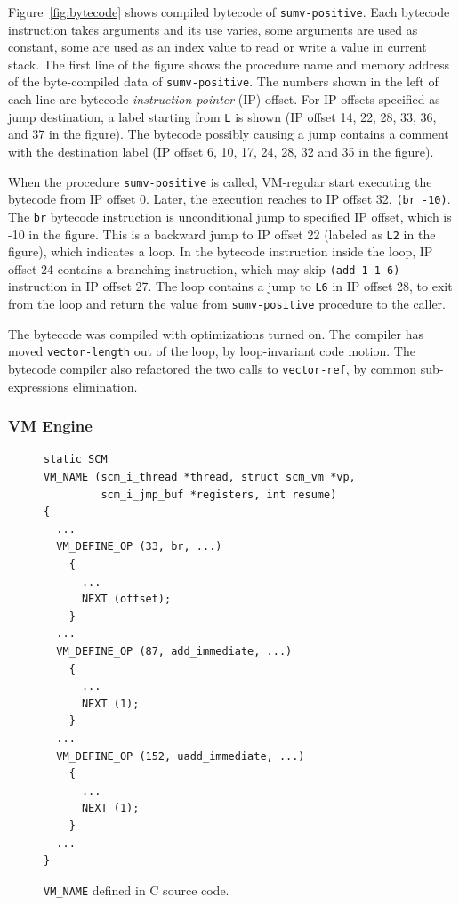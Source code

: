 \documentclass[preprint, 10pt]{sigplanconf}
\begin{document}
Figure~\hyperref[fig:bytecode]{\ref{fig:bytecode}} shows compiled bytecode of
\texttt{sumv-positive}. Each bytecode instruction takes arguments and its use
varies, some arguments are used as constant, some are used as an index value to
read or write a value in current stack. The first line of the figure shows the
procedure name and memory address of the byte-compiled data of
\texttt{sumv-positive}. The numbers shown in the left of each line are bytecode
\textit{instruction pointer} (IP) offset. For IP offsets specified as jump
destination, a label starting from \texttt{L} is shown (IP offset 14, 22, 28,
33, 36, and 37 in the figure). The bytecode possibly causing a jump contains a
comment with the destination label (IP offset 6, 10, 17, 24, 28, 32 and 35 in
the figure).

When the procedure \texttt{sumv-positive} is called, VM-regular start executing the
bytecode from IP offset 0. Later, the execution reaches to IP offset 32,
\texttt{(br -10)}. The \texttt{br} bytecode instruction is unconditional jump to
specified IP offset, which is -10 in the figure. This is a backward jump to IP
offset 22 (labeled as \texttt{L2} in the figure), which indicates a loop. In the
bytecode instruction inside the loop, IP offset 24 contains a branching
instruction, which may skip \texttt{(add 1 1 6)} instruction in IP offset
27. The loop contains a jump to \texttt{L6} in IP offset 28, to exit from the
loop and return the value from \texttt{sumv-positive} procedure to the caller.

The bytecode was compiled with optimizations turned on. The compiler has moved
\texttt{vector-length} out of the loop, by loop-invariant code motion. The
bytecode compiler also refactored the two calls to \texttt{vector-ref}, by
common sub-expressions elimination.

\subsubsection{VM Engine}
\label{sec:guilevmengine}

\begin{figure}
  \centering
  \small
\begin{verbatim}
static SCM
VM_NAME (scm_i_thread *thread, struct scm_vm *vp,
         scm_i_jmp_buf *registers, int resume)
{
  ...
  VM_DEFINE_OP (33, br, ...)
    {
      ...
      NEXT (offset);
    }
  ...
  VM_DEFINE_OP (87, add_immediate, ...)
    {
      ...
      NEXT (1);
    }
  ...
  VM_DEFINE_OP (152, uadd_immediate, ...)
    {
      ...
      NEXT (1);
    }
  ...
}
\end{verbatim}
\caption{\texttt{VM\_NAME} defined in C source code.}
\label{fig:vmnameorig}
\end{figure}
\end{document}
